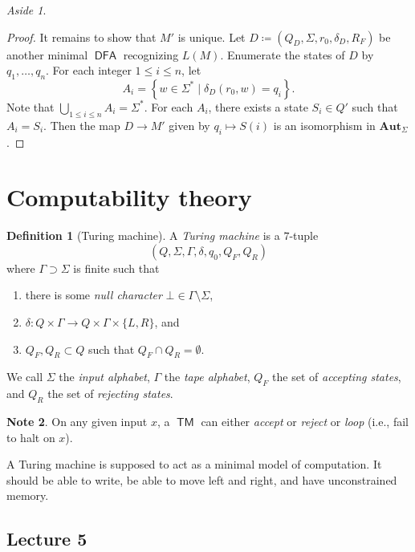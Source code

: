 \documentclass[10pt,letterpaper,cm]{nupset}
\theoremstyle{definition}
\newtheorem{definition}{Definition}[subsection]
\newtheorem{note}[definition]{Note}
\theoremstyle{theorem}
\theoremstyle{remark}
\newtheorem*{aside}{Aside}
\newcommand{\1}{\mathbf{1}}
\newcommand{\0}{\vec 0}
\DeclareMathOperator{\TM}{\mathsf{TM}}
\DeclareMathOperator{\DFA}{\mathsf{DFA}}
\begin{document}
\begin{aside}
\begin{proof}
It remains to show that $M'$ is unique. Let $D\coloneqq \left(Q_D, \Sigma, r_0, \delta_D, R_F\right)$ be another minimal $\DFA$ recognizing $L(M)$. Enumerate the states of $D$ by $q_1, \ldots, q_n$. For each integer $1\leq i \leq n$, let $$A_i = \left\{w\in \Sigma^{\ast} \mid \delta_D(r_0, w) =q_i  \right\}.$$ Note that $\bigcup_{1\leq i \leq n}A_i = \Sigma^{\ast}$. For each $A_i$, there exists a state $S_i \in Q'$ such that $A_i = S_i$. Then the map $D \to M'$ given by $q_i \mapsto S(i)$ is an isomorphism in $\mathbf{Aut}_{\Sigma}$.
\end{proof}
\end{aside}

\section{Computability theory}

\begin{definition}[Turing machine]
A \textit{Turing machine} is a $7$-tuple $$\left(Q, \Sigma, \Gamma, \delta, q_0, Q_F, Q_R\right)$$ where $\Gamma \supset \Sigma$ is finite such that 
\begin{enumerate}[label=(\roman*)]
\item there is some \textit{null character} $\bot \in \Gamma \setminus \Sigma$,
\item $\delta : Q\times \Gamma \to Q \times \Gamma \times \{L, R\}$, and 
\item $Q_F, Q_R \subset Q$ such that $Q_F \cap Q_R = \emptyset$. 
\end{enumerate}
We call $\Sigma$ the \textit{input alphabet}, $\Gamma$ the \textit{tape alphabet}, $Q_F$ the set of \textit{accepting states}, and $Q_R$ the set of \textit{rejecting states}.
\end{definition}

\begin{note}
On any given input $x$, a $\TM$ can either \textit{accept} or \textit{reject} or \textit{loop} (i.e., fail to halt on $x$).
\end{note}

\smallskip

A Turing machine is supposed to act as a minimal model of computation. It should be able to write, be able to move left and right, and have unconstrained memory.


\subsection{Lecture 5}
\end{document}
